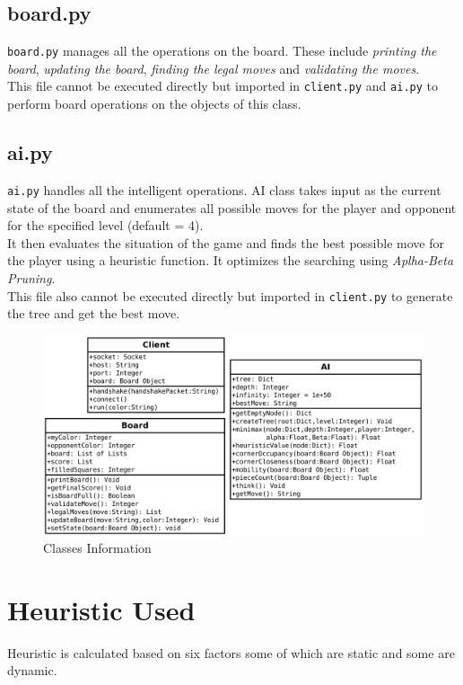\documentclass[a4paper,10pt]{article}
\begin{document}
\subsection*{board.py}
\texttt{board.py} manages all the operations on the board. These include \textit{printing the board}, \textit{updating the board}, \textit{finding the legal moves} and \textit{validating the moves}.\\[0.2cm]
This file cannot be executed directly but imported in \texttt{client.py} and \texttt{ai.py} to perform board operations on the objects of this class.

\subsection*{ai.py}
\texttt{ai.py} handles all the intelligent operations. AI class takes input as the current state of the board and enumerates all possible moves for the player and opponent for the specified level (default = 4).\\[0.2cm]
It then evaluates the situation of the game and finds the best possible move for the player using a heuristic function. It optimizes the searching using \textit{Aplha-Beta Pruning}.\\[0.2cm]
This file also cannot be executed directly but imported in \texttt{client.py} to generate the tree and get the best move.

\begin{figure}[h]
  \vspace{1cm}
  \centering
  \includegraphics[scale=0.42]{Classes.pdf}
  \caption{Classes Information}
\end{figure}

\newpage
\section*{Heuristic Used}
Heuristic is calculated based on six factors some of which are static and some are dynamic.
\end{document}
